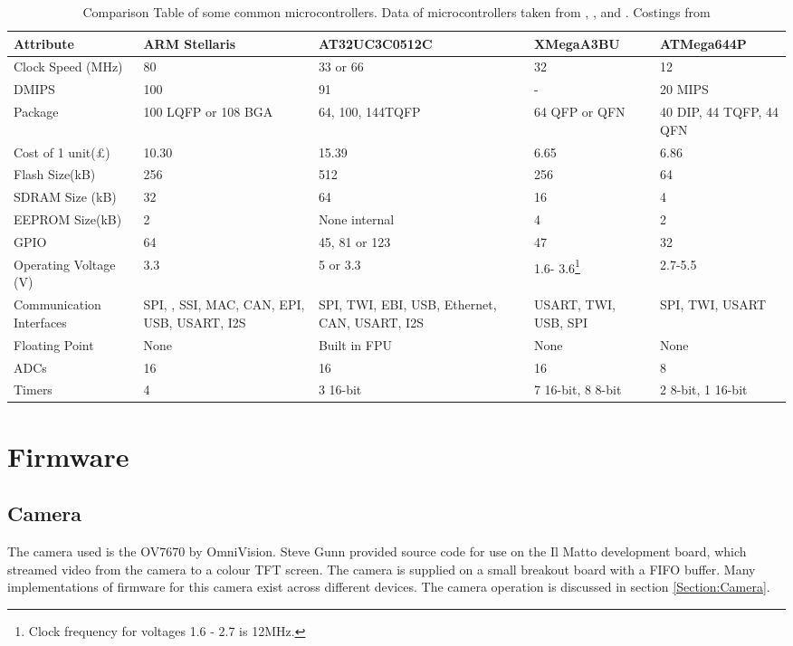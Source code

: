 \begin{table}
\centering
\begin{tabular}{|p{3.0cm}|p{2.0cm}|p{3cm}|p{2.3cm}|p{2.4cm}|}\hline
Attribute				& 	ARM Stellaris		&	AT32UC3C0512C 		&	XMegaA3BU	&	ATMega644P 	\\	\hline
Clock Speed	(MHz)		&	80					&	33 or 66			&	32			&	12			\\
DMIPS					&	100					&	91					&	-			&	20 MIPS		\\
Package					&	100 LQFP or 108 BGA	&	64, 100, 144TQFP	&	64 QFP or QFN & 40 DIP, 44 TQFP, 44 QFN \\
Cost of 1 unit(\pounds)	&	10.30				& 15.39 &	6.65	 & 6.86\\
Flash Size(kB)			&	256					&	512					&	256			&	64 \\
SDRAM Size (kB)			&	32					&	64					&	16			&	4	\\
EEPROM Size(kB)			&	2					&	None internal		&	4			&	2 	\\
GPIO					&	64					& 	45, 81 or 123		&	47			& 	32	\\
Operating Voltage (V)	&	3.3					& 	5	or 3.3			& 	1.6- 3.6\footnote{Clock frequency for voltages 1.6 - 2.7 is 12MHz.}		& 	2.7-5.5	\\
Communication Interfaces &	SPI, \itc, SSI, MAC, CAN, EPI, USB, USART, I2S	& SPI, TWI, EBI, USB, Ethernet, CAN, USART, I2S	&	USART, TWI, USB, SPI 		&	SPI, TWI, USART \\
Floating Point			&	None				&	Built in FPU		&	None		&	None		\\
ADCs					&	16					&	16					&	16			&	8			\\
Timers					&	4					&	3 16-bit			& 7 16-bit, 8 8-bit & 2 8-bit, 1 16-bit \\
\hline
\end{tabular}
\caption{Comparison Table of some common microcontrollers. Data of microcontrollers taken from \cite{Atmel:UC3C}, \cite{Atmel:644P}, \cite{Atmel:A3BU} and \cite{ARM:Stellaris}. Costings from \cite{Farnell}}
\label{tab:uCComp}
\end{table}

\section{Firmware}
\subsection{Camera}

The camera used is the OV7670 by OmniVision. Steve Gunn provided source code for use on the Il Matto development board, which streamed video from the camera to a colour TFT screen. The camera is supplied on a small breakout board with a FIFO buffer. Many implementations of firmware for this camera exist across different devices. The camera operation is discussed in section \ref{Section:Camera}. 
